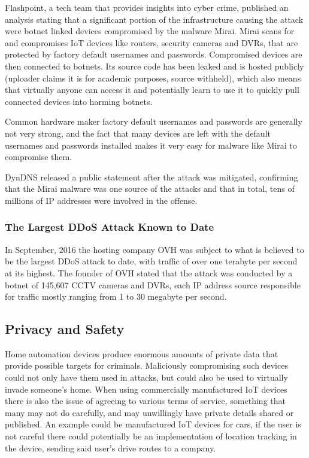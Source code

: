 \documentclass[a4paper, conference]{IEEEtran/IEEEtran}
\begin{document}
Flashpoint, a tech team that provides insights into cyber crime,\cite{flashpoint} published an analysis stating that a significant portion of the infrastructure causing the attack were botnet linked devices compromised by the malware Mirai.\cite{fpmirai} Mirai scans for and compromises IoT devices like routers, security cameras and DVRs, that are protected by factory default usernames and passwords. Compromised devices are then connected to botnets. Its source code has been leaked and is hosted publicly (uploader claims it is for academic purposes, source withheld), which also means that virtually anyone can access it and potentially learn to use it to quickly pull connected devices into harming botnets.

Common hardware maker factory default usernames and passwords are generally not very strong, and the fact that many devices are left with the default usernames and passwords installed makes it very easy for malware like Mirai to compromise them.\cite{whomakes}

DynDNS released a public statement after the attack was mitigated, confirming that the Mirai malware was one source of the attacks and that in total, tens of millions of IP addresses were involved in the offense.\cite{dynstatement}

\subsubsection{The Largest DDoS Attack Known to Date}
In September, 2016 the hosting company OVH was subject to what is believed to be the largest DDoS attack to date, with traffic of over one terabyte per second at its highest.\cite{scmagazine} The founder of OVH stated that the attack was conducted by a botnet of 145,607 CCTV cameras and DVRs, each IP address source responsible for traffic mostly ranging from 1 to 30 megabyte per second.

\subsection{Privacy and Safety}
\label{sec:privacy}
Home automation devices produce enormous amounts of private data that provide possible targets for criminals. Maliciously compromising such devices could not only have them used in attacks, but could also be used to virtually invade someone's home. When using commercially manufactured IoT devices there is also the issue of agreeing to various terms of service, something that many may not do carefully, and may unwillingly have private details shared or published. An example could be manufactured IoT devices for cars, if the user is not careful there could potentially be an implementation of location tracking in the device, sending said user's drive routes to a company.\cite{meola}
\end{document}
